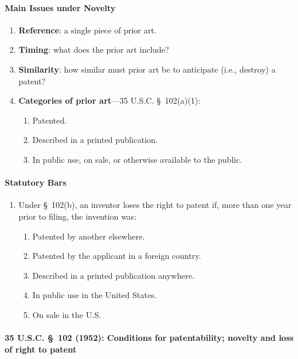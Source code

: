 \paragraph{Main Issues under Novelty}

\begin{enumerate}
    \item \textbf{Reference}: a single piece of prior art.
    \item \textbf{Timing}: what does the prior art include?
    \item \textbf{Similarity}: how similar must prior art be to anticipate 
    (i.e., destroy) a patent?
    \item \textbf{Categories of prior art}---35 U.S.C. \S\ 102(a)(1):
    \begin{enumerate}
        \item Patented.
        \item Described in a printed publication.
        \item In public use, on sale, or otherwise available to the public.
    \end{enumerate}
\end{enumerate}

\paragraph{Statutory Bars}

\begin{enumerate}
    \item Under \S\ 102(b), an inventor loses the right to patent if, more 
    than one year prior to filing, the invention was:
    \begin{enumerate}
        \item Patented by another elsewhere.
        \item Patented by the applicant in a foreign country.
        \item Described in a printed publication anywhere.
        \item In public use in the United States.
        \item On sale in the U.S.
    \end{enumerate}
\end{enumerate}

\paragraph{35 U.S.C. \S\ 102 (1952): Conditions for patentability; novelty and 
loss of right to patent}

